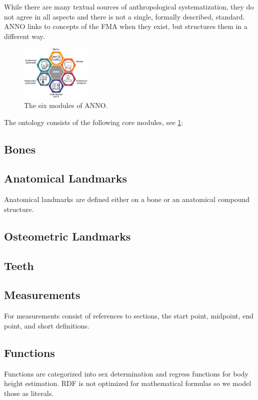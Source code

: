 \documentclass[sw]{iosart2x}
\begin{document}
While there are many textual sources of anthropological systematization, they do not agree in all aspects and there is not a single, formally described, standard.
ANNO links to concepts of the FMA when they exist, but structures them in a different way.

\begin{figure}[h]
\includegraphics[width=0.3\textwidth]{img/modules.pdf}
\caption{The six modules of ANNO.}\label{fig:modules}
\end{figure}

The ontology consists of the following core modules, see \cref{fig:modules}:
\subsection{Bones}

\subsection{Anatomical Landmarks}
Anatomical landmarks are defined either on a bone or an anatomical compound structure.
\subsection{Osteometric Landmarks}

\subsection{Teeth}
\subsection{Measurements}
For measurements consist of references to sections, the start point, midpoint, end point, and short definitions.

\subsection{Functions}
Functions are categorized into sex determination and regress functions for body height estimation.
RDF is not optimized for mathematical formulas so we model those as literals.
\end{document}
